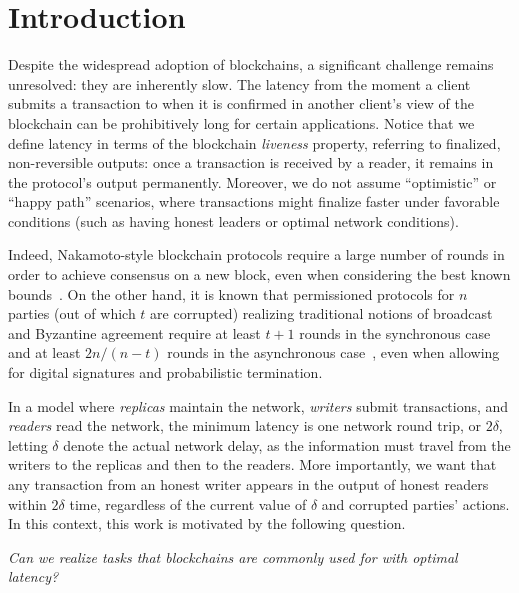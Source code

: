 \documentclass[pdflatex,sn-mathphys-num]{sn-jnl}%
\theoremstyle{thmstyleone}%
\theoremstyle{thmstyletwo}%
\theoremstyle{thmstylethree}%
\begin{document}

\maketitle

\section{Introduction}
Despite the widespread adoption of blockchains, a significant challenge remains unresolved: they are inherently slow. The latency from the moment a client submits a transaction to when it is confirmed in another client's view of the blockchain can be prohibitively long for certain applications. Notice that we define latency in terms of the blockchain \emph{liveness} property, referring to finalized, non-reversible outputs: once a transaction is received by a reader, it remains in the protocol's output permanently.
Moreover, we do not assume ``optimistic'' or ``happy path'' scenarios, where transactions might finalize faster under favorable conditions (such as having honest leaders or optimal network conditions).

Indeed, Nakamoto-style blockchain protocols require a large number of rounds in order to achieve consensus on a new block, even when considering the best known bounds~\cite{DBLP:conf/crypto/GaziRR23}. On the other hand, it is known that permissioned protocols for $n$ parties (out of which $t$ are corrupted) realizing traditional notions of broadcast and Byzantine agreement require at least $t+1$ rounds in the synchronous case~\cite{DBLP:journals/ipl/AguileraT99} and at least $2n/(n-t)$ rounds in the asynchronous case~\cite{DBLP:conf/focs/GarayKKO07}, even when allowing for digital signatures and probabilistic termination.

In a model where \emph{replicas} maintain the network, \emph{writers} submit transactions, and \emph{readers} read the network, the minimum latency is one network round trip, or $2\delta$, letting $\delta$ denote the actual network delay, as the information must travel from the writers to the replicas and then to the readers. More importantly, we want that any transaction from an honest writer appears in the output of honest readers within $2\delta$ time, regardless of the current value of $\delta$ and corrupted parties' actions.
In this context, this work is motivated by the following question.

\begin{center}
	\emph{Can we realize tasks that blockchains are commonly used for with optimal latency?}
\end{center}
\end{document}

